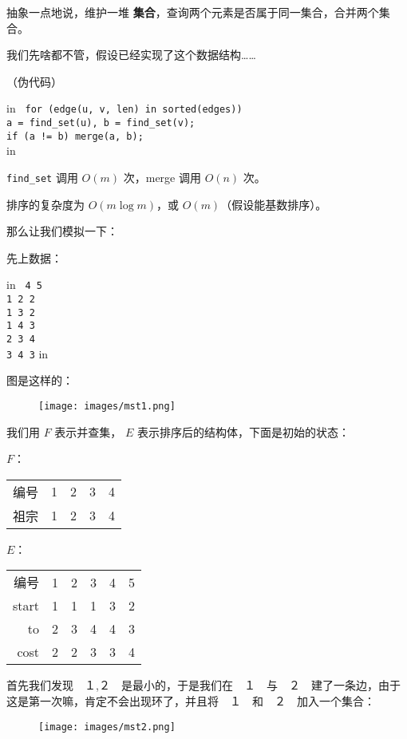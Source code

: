 抽象一点地说，维护一堆 \textbf{集合}，查询两个元素是否属于同一集合，合并两个集合。

我们先啥都不管，假设已经实现了这个数据结构……

（伪代码）

 in
\texttt{
for (edge(u, v, len) in sorted(edges)) {\\	a = find_set(u), b = find_set(v);\\	if (a != b) merge(a, b);\\}}
 in

\texttt{find_set} 调用 $O(m)$ 次，merge 调用 $O(n)$ 次。

排序的复杂度为 $O(m \log m)$，或 $O(m)$（假设能基数排序）。

那么让我们模拟一下：

先上数据：

 in
\texttt{
4 5\\1 2 2\\1 3 2\\1 4 3\\2 3 4\\3 4 3}
 in

图是这样的：

\begin{figure}[h]
\centering
\texttt{[image: images/mst1.png]} 

\end{figure}

我们用 $F$ 表示并查集， $E$ 表示排序后的结构体，下面是初始的状态：

$F$：

\begin{tabular}{rrrrr}
\hline
编号& 1& 2& 3& 4\\祖宗& 1& 2& 3& 4\\\hline
\end{tabular}

$E$：

\begin{tabular}{rrrrrr}
\hline
编号& 1& 2& 3& 4& 5\\start& 1& 1& 1& 3& 2\\to& 2& 3& 4& 4& 3\\cost& 2& 2& 3& 3& 4\\\hline
\end{tabular}

首先我们发现　１,２　是最小的，于是我们在　１　与　２　建了一条边，由于这是第一次嘛，肯定不会出现环了，并且将　１　和　２　加入一个集合：

\begin{figure}[h]
\centering
\texttt{[image: images/mst2.png]} 

\end{figure}

